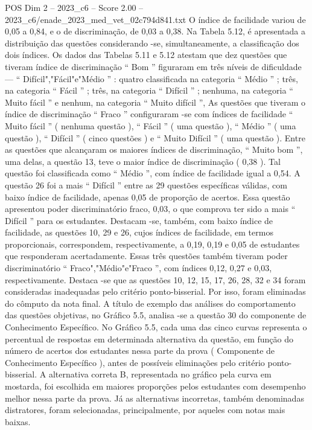 \begin{textsample}{POS Dim 2 – 2023\_c6 – Score 2.00 – 2023\_c6/enade\_2023\_med\_vet\_02c794d841.txt}
O índice de facilidade variou de 0,05 a 0,84, e o de discriminação, de 0,03 a 0,38.
Na Tabela 5.12, é apresentada a distribuição das questões considerando -se, simultaneamente, a classificação dos dois índices.
Os dados das Tabelas 5.11 e 5.12 atestam que dez questões que tiveram índice de discriminação “ Bom ” figuraram em três níveis de dificuldade — “ Difícil","Fácil"e"Médio ” : quatro classificada na categoria “ Médio ” ; três, na categoria “ Fácil ” ; três, na categoria “ Difícil ” ; nenhuma, na categoria “ Muito fácil ” e nenhum, na categoria “ Muito difícil ”, As questões que tiveram o índice de discriminação “ Fraco ” configuraram -se com índices de facilidade “ Muito fácil ” ( nenhuma questão ), “ Fácil ” ( uma questão ), “ Médio ” ( uma questão ), “ Difícil ” ( cinco questões ) e “ Muito Difícil ” ( uma questão ).
Entre as questões que alcançaram os maiores índices de discriminação, “ Muito bom ”, uma delas, a questão 13, teve o maior índice de discriminação ( 0,38 ).
Tal questão foi classificada como “ Médio ”, com índice de facilidade igual a 0,54.
A questão 26 foi a mais “ Difícil ” entre as 29 questões específicas válidas, com baixo índice de facilidade, apenas 0,05 de proporção de acertos.
Essa questão apresentou poder discriminatório fraco, 0,03, o que comprova ter sido a mais “ Difícil ” para os estudantes.
Destacam -se, também, com baixo índice de facilidade, as questões 10, 29 e 26, cujos índices de facilidade, em termos proporcionais, correspondem, respectivamente, a 0,19, 0,19 e 0,05 de estudantes que responderam acertadamente.
Essas três questões também tiveram poder discriminatório “ Fraco","Médio"e"Fraco ”, com índices 0,12, 0,27 e 0,03, respectivamente.
Destaca -se que as questões 10, 12, 15, 17, 26, 28, 32 e 34 foram consideradas inadequadas pelo critério ponto-bisserial.
Por isso, foram eliminadas do cômputo da nota final.
A título de exemplo das análises do comportamento das questões objetivas, no Gráfico 5.5, analisa -se a questão 30 do componente de Conhecimento Específico.
No Gráfico 5.5, cada uma das cinco curvas representa o percentual de respostas em determinada alternativa da questão, em função do número de acertos dos estudantes nessa parte da prova ( Componente de Conhecimento Específico ), antes de possíveis eliminações pelo critério ponto-bisserial.
A alternativa correta B, representada no gráfico pela curva em mostarda, foi escolhida em maiores proporções pelos estudantes com desempenho melhor nessa parte da prova.
Já as alternativas incorretas, também denominadas distratores, foram selecionadas, principalmente, por aqueles com notas mais baixas.

\end{textsample}
